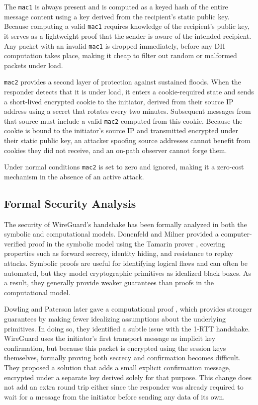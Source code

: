 The \texttt{mac1} is always present and is computed as a keyed hash of the entire message content using a key derived from the recipient's static public key. Because computing a valid \texttt{mac1} requires knowledge of the recipient's public key, it serves as a lightweight proof that the sender is aware of the intended recipient. Any packet with an invalid \texttt{mac1} is dropped immediately, before any DH computation takes place, making it cheap to filter out random or malformed packets under load.

\texttt{mac2} provides a second layer of protection against sustained floods. When the responder detects that it is under load, it enters a cookie-required state and sends a short-lived encrypted cookie to the initiator, derived from their source IP address using a secret that rotates every two minutes. Subsequent messages from that source must include a valid \texttt{mac2} computed from this cookie. Because the cookie is bound to the initiator's source IP and transmitted encrypted under their static public key, an attacker spoofing source addresses cannot benefit from cookies they did not receive, and an on-path observer cannot forge them.

Under normal conditions \texttt{mac2} is set to zero and ignored, making it a zero-cost mechanism in the absence of an active attack.

\subsection{Formal Security Analysis} 
The security of WireGuard's handshake has been formally analyzed in both the symbolic and computational models. Donenfeld and Milner provided a computer-verified proof in the symbolic model using the Tamarin prover \cite{donenfeld2017formal}, covering properties such as forward secrecy, identity hiding, and resistance to replay attacks. Symbolic proofs are useful for identifying logical flaws and can often be automated, but they model cryptographic primitives as idealized black boxes. As a result, they generally provide weaker guarantees than proofs in the computational model.

Dowling and Paterson later gave a computational proof \cite{dowling2018wireguard}, which provides stronger guarantees by making fewer idealizing assumptions about the underlying primitives. In doing so, they identified a subtle issue with the 1-RTT handshake. WireGuard uses the initiator's first transport message as implicit key confirmation, but because this packet is encrypted using the session keys themselves, formally proving both secrecy and confirmation becomes difficult. They proposed a solution that adds a small explicit confirmation message, encrypted under a separate key derived solely for that purpose. This change does not add an extra round trip either since the responder was already required to wait for a message from the initiator before sending any data of its own.


